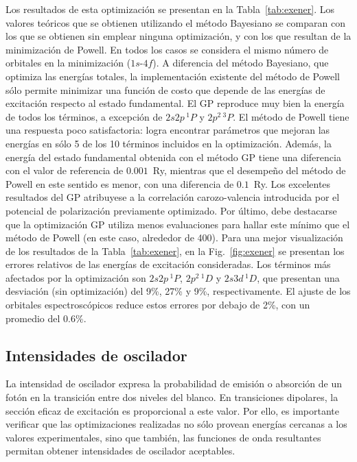 Los resultados de esta optimización se presentan en la 
Tabla~\ref{tab:exener}. Los valores teóricos que se obtienen utilizando 
el método Bayesiano se comparan con los que se obtienen sin emplear 
ninguna optimización, y con los que resultan de la minimización de 
Powell. En todos los casos se considera el mismo número de orbitales en 
la minimización ($1s$-$4f$). A diferencia del método Bayesiano, que 
optimiza las energías totales, la implementación existente del método de 
Powell sólo permite minimizar una función de costo que depende de las 
energías de excitación respecto al estado fundamental. El GP reproduce 
muy bien la energía de todos los términos, a excepción de $2s2p\,^1\!P$ 
y $2p^2\,^3\!P$. El método de Powell tiene una respuesta poco 
satisfactoria: logra encontrar parámetros que mejoran las energías en 
sólo 5 de los 10 términos incluidos en la optimización. Además, la 
energía del estado fundamental obtenida con el método GP tiene una 
diferencia con el valor de referencia de $0.001$~Ry, mientras que el 
desempeño del método de Powell en este sentido es menor, con una 
diferencia de $0.1$~Ry. Los excelentes resultados del GP atribuyese a la 
correlación carozo-valencia introducida por el potencial de polarización 
previamente optimizado. Por último, debe destacarse que la optimización 
GP utiliza menos evaluaciones para hallar este mínimo que el método de 
Powell (en este caso, alrededor de 400). Para una mejor visualización de 
los resultados de la Tabla~\ref{tab:exener}, en la Fig.~\ref{fig:exener} 
se presentan los errores relativos de las energías de excitación 
consideradas. Los términos más afectados por la optimización son 
$2s2p\,^1\!P$, $2p^2\,^1\!D$ y $2s3d\,^1\!D$, que presentan una 
desviación (sin optimización) del 9\%, 27\% y 9\%, respectivamente. El 
ajuste de los orbitales espectroscópicos reduce estos errores por debajo 
de 2\%, con un promedio del $0.6\%$. 

\subsection{Intensidades de oscilador}

La intensidad de oscilador expresa la probabilidad de emisión o 
absorción de un fotón en la transición entre dos niveles del blanco. En 
transiciones dipolares, la sección eficaz de excitación es proporcional 
a este valor. Por ello, es importante verificar que las optimizaciones 
realizadas no sólo provean energías cercanas a los valores 
experimentales, sino que también, las funciones de onda resultantes 
permitan obtener intensidades de oscilador aceptables.

